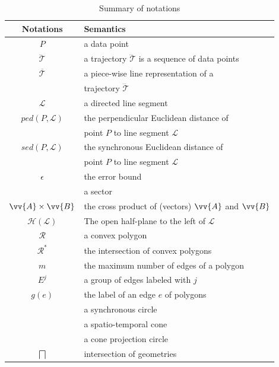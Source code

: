 \begin{table}
	\renewcommand{\arraystretch}{1.35}
	\caption{\small Summary of notations}
	\centering
	\footnotesize
	\begin{tabular}{|c|l|}
		\hline
		{\bf Notations}& {\bf Semantics}   \\
		\hline %
		$P$ & a data point \\
		\hline
		$\dddot{\mathcal{T}}$ & a trajectory $\dddot{\mathcal{T}}$ is a sequence of data points\\
		\hline
		$\overline{\mathcal{T}}$&  {a piece-wise line representation of a }	\\
								& trajectory $\dddot{\mathcal{T}}$		\\
		\hline
		$\mathcal{L}$ & a directed line segment  \\
		\hline
		$ped(P, \mathcal{L})$ &  {the perpendicular Euclidean distance of }	\\
								& point $P$ to line segment $\mathcal{L}$	\\
		\hline
		$sed(P, \mathcal{L})$ & {the synchronous Euclidean distance of }	\\
								& point $P$ to line segment $\mathcal{L}$	\\
		\hline
		$\epsilon$ & the error bound \\
		\hline
		\sector{} & a sector\\
		\hline
		$\vv{A} \times \vv{B}$ & the cross product of (vectors) $\vv{A}$ and $\vv{B}$\\
		\hline
		$\mathcal{H}(\mathcal{L})$ & The open half-plane to the left of $\mathcal{L}$ \\
		\hline
		$\mathcal{R}$& a convex polygon \\
		\hline
		$\mathcal{R}^*$ & the intersection of convex polygons \\
		\hline
		$m$ & the maximum number of edges of a polygon\\
		\hline
		$E^j$ & a group of edges labeled with $j$\\
		\hline
		$g(e)$ & the label of an edge $e$ of polygons \\
		\hline
		\circle{} & a synchronous circle\\
		\hline
		\cone{} & a spatio-temporal cone \\
		\hline
		\pcircle{} & a cone projection circle \\
		\hline
		$\bigsqcap$ & intersection of geometries\\
		\hline
	\end{tabular}
	\label{tab:notations}
	\vspace{-2ex}
\end{table}


